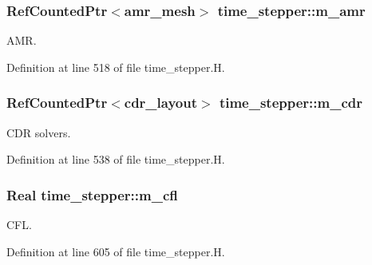 \subsubsection[{\texorpdfstring{m\+\_\+amr}{m_amr}}]{\setlength{\rightskip}{0pt plus 5cm}Ref\+Counted\+Ptr$<${\bf amr\+\_\+mesh}$>$ time\+\_\+stepper\+::m\+\_\+amr\hspace{0.3cm}{\ttfamily [protected]}}\hypertarget{classtime__stepper_a2ff2fb25e4e79b742d10d490d4296b6a}{}\label{classtime__stepper_a2ff2fb25e4e79b742d10d490d4296b6a}


A\+MR. 



Definition at line 518 of file time\+\_\+stepper.\+H.

\subsubsection[{\texorpdfstring{m\+\_\+cdr}{m_cdr}}]{\setlength{\rightskip}{0pt plus 5cm}Ref\+Counted\+Ptr$<${\bf cdr\+\_\+layout}$>$ time\+\_\+stepper\+::m\+\_\+cdr\hspace{0.3cm}{\ttfamily [protected]}}\hypertarget{classtime__stepper_a21f779561ea34ed6f6785fc25d8934d0}{}\label{classtime__stepper_a21f779561ea34ed6f6785fc25d8934d0}


C\+DR solvers. 



Definition at line 538 of file time\+\_\+stepper.\+H.

\subsubsection[{\texorpdfstring{m\+\_\+cfl}{m_cfl}}]{\setlength{\rightskip}{0pt plus 5cm}Real time\+\_\+stepper\+::m\+\_\+cfl\hspace{0.3cm}{\ttfamily [protected]}}\hypertarget{classtime__stepper_a0a66eaadfed367bc8745e9214acce772}{}\label{classtime__stepper_a0a66eaadfed367bc8745e9214acce772}


C\+FL. 



Definition at line 605 of file time\+\_\+stepper.\+H.

